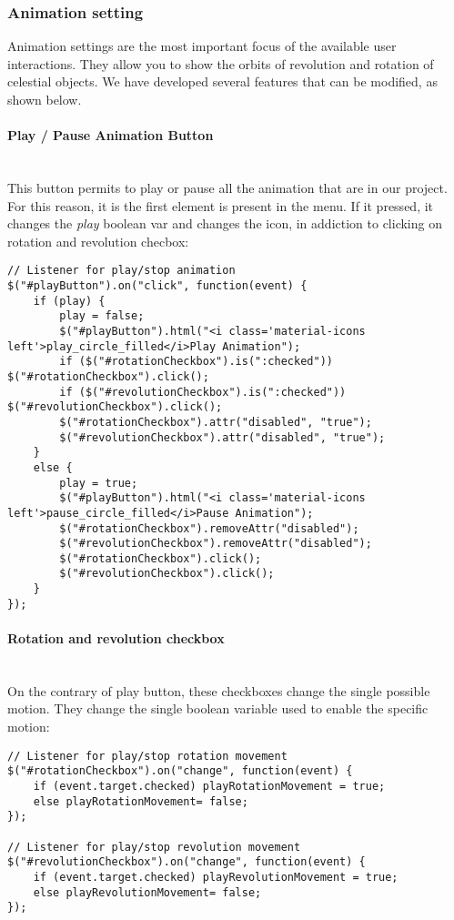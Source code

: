 \documentclass{article}
\begin{document}
\subsubsection{Animation setting}
Animation settings are the most important focus of the available user interactions. They allow you to show the orbits of revolution and rotation of celestial objects. We have developed several features that can be modified, as shown below.
\paragraph{Play / Pause Animation Button} \mbox{}\\
This button permits to play or pause all the animation that are in our project. For this reason, it is the first element is present in the menu. If it pressed, it changes the \textit{play} boolean var and changes the icon, in addiction to clicking on rotation and revolution checbox: 
\begin{lstlisting}
// Listener for play/stop animation
$("#playButton").on("click", function(event) {
	if (play) {
		play = false;
		$("#playButton").html("<i class='material-icons left'>play_circle_filled</i>Play Animation");
		if ($("#rotationCheckbox").is(":checked")) $("#rotationCheckbox").click();
		if ($("#revolutionCheckbox").is(":checked")) $("#revolutionCheckbox").click();
		$("#rotationCheckbox").attr("disabled", "true");
		$("#revolutionCheckbox").attr("disabled", "true");
	}
	else {
		play = true;
		$("#playButton").html("<i class='material-icons left'>pause_circle_filled</i>Pause Animation");
		$("#rotationCheckbox").removeAttr("disabled");
		$("#revolutionCheckbox").removeAttr("disabled");
		$("#rotationCheckbox").click();
		$("#revolutionCheckbox").click();
	}
});
\end{lstlisting}
\paragraph{Rotation and revolution checkbox}\mbox{}\\
On the contrary of play button, these checkboxes change the single possible motion. They change the single boolean variable used to enable the specific motion:
\begin{lstlisting} 
// Listener for play/stop rotation movement
$("#rotationCheckbox").on("change", function(event) {
	if (event.target.checked) playRotationMovement = true;
	else playRotationMovement= false;
});

// Listener for play/stop revolution movement
$("#revolutionCheckbox").on("change", function(event) {
	if (event.target.checked) playRevolutionMovement = true;
	else playRevolutionMovement= false;
});
\end{lstlisting}
\end{document}
